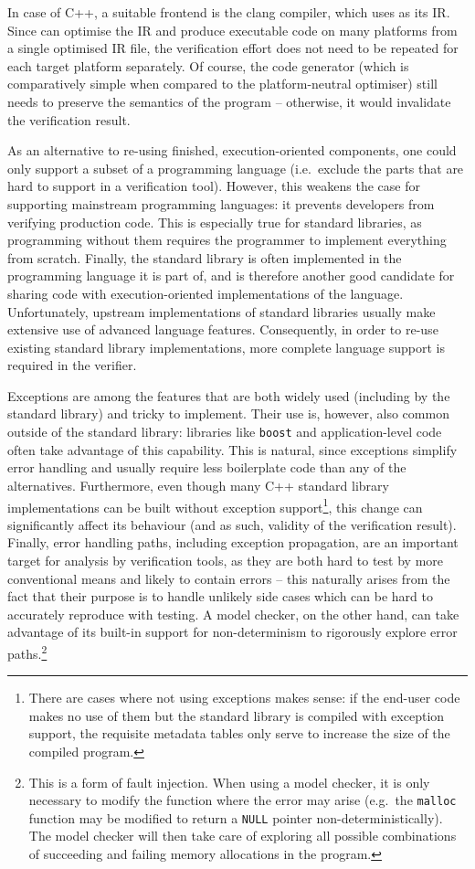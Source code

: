 In case of C++, a suitable frontend is the clang compiler, which uses
\llvm{} as its IR. Since \llvm{} can optimise the IR and produce executable
code on many platforms from a single optimised IR file, the verification
effort does not need to be repeated for each target platform separately.
Of course, the code generator (which is comparatively simple when
compared to the platform-neutral optimiser) still needs to preserve the
semantics of the program -- otherwise, it would invalidate the
verification result.

As an alternative to re-using finished, execution-oriented components,
one could only support a subset of a programming language (i.e.~exclude
the parts that are hard to support in a verification tool). However,
this weakens the case for supporting mainstream programming languages:
it prevents developers from verifying production code. This is
especially true for standard libraries, as programming without them
requires the programmer to implement everything from scratch. Finally,
the standard library is often implemented in the programming language it
is part of, and is therefore another good candidate for sharing code
with execution-oriented implementations of the language. Unfortunately,
upstream implementations of standard libraries usually make extensive
use of advanced language features. Consequently, in order to re-use
existing standard library implementations, more complete language
support is required in the verifier.

Exceptions are among the features that are both widely used (including
by the standard library) and tricky to implement. Their use is, however,
also common outside of the standard library: libraries like
\texttt{boost} and application-level code often take advantage of this
capability. This is natural, since exceptions simplify error handling
and usually require less boilerplate code than any of the alternatives.
Furthermore, even though many C++ standard library implementations can
be built without exception support\footnote{There are cases where not
  using exceptions makes sense: if the end-user code makes no use of
  them but the standard library is compiled with exception support, the
  requisite metadata tables only serve to increase the size of the
  compiled program.}, this change can significantly affect its behaviour
(and as such, validity of the verification result). Finally, error
handling paths, including exception propagation, are an important target
for analysis by verification tools, as they are both hard to test by
more conventional means and likely to contain errors -- this naturally
arises from the fact that their purpose is to handle unlikely side cases
which can be hard to accurately reproduce with testing. A model checker,
on the other hand, can take advantage of its built-in support for
non-determinism to rigorously explore error paths.\footnote{This is a
  form of fault injection. When using a model checker, it is only
  necessary to modify the function where the error may arise (e.g.~the
  \texttt{malloc} function may be modified to return a \texttt{NULL}
  pointer non-deterministically). The model checker will then take care
  of exploring all possible combinations of succeeding and failing
  memory allocations in the program.}

